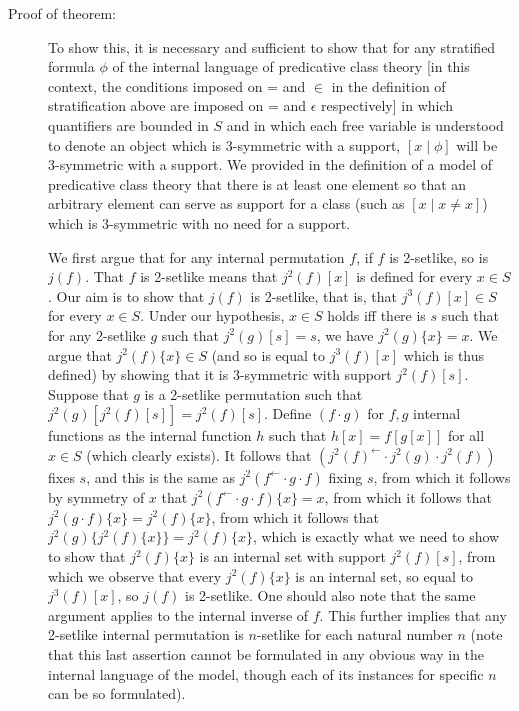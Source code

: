 \documentclass[12pt]{article}
\begin{document}
\begin{description}
\item[Proof of theorem:]   To show this, it is necessary and sufficient to show that for any stratified formula $\phi$ of the internal language of predicative class theory [in this context, the conditions imposed on = and $\in$ in the definition of stratification above are imposed on = and $\epsilon$ respectively] in which quantifiers are bounded in $S$ and  in which each free variable is understood to denote an object which is 3-symmetric
with a support, $[x \mid \phi]$ will be 3-symmetric with a support.  We provided in the definition of a model of predicative class theory  that there is at least one element so that an arbitrary element
can serve as support for a class (such as $[x\mid x \neq x]$) which is 3-symmetric with no need for a support. 

We first argue that for any internal permutation $f$,  if $f$ is 2-setlike,  so is $j(f)$.  That $f$ is 2-setlike means that $j^2(f)[x]$ is defined for every $x \in S$.   Our aim is to show that $j(f)$ is 2-setlike,
that is, that $j^3(f)[x]\in S$ for every $x \in S$.  Under our hypothesis, $x \in S$ holds iff there is $s$ such that for any 2-setlike $g$ such that $j^2(g)[s]=s$,
we have $j^2(g)\{x\}=x$.   We argue that $j^2(f)\{x\} \in S$ (and so is equal to $j^3(f)[x]$ which is thus defined)  by showing that  it is 3-symmetric with support $j^2(f)[s]$.  Suppose that $g$ is a 2-setlike permutation
such that $j^2(g)[j^2(f)[s]]=j^2(f)[s]$.   Define $(f \cdot g)$ for $f,g$ internal functions as the internal function $h$ such that $h[x] = f[g[x]]$ for all $x \in S$ (which clearly exists).
It follows that $(j^2(f)^{\leftarrow} \cdot j^2(g) \cdot j^2(f))$ fixes $s$, and this is the same as $j^2(f^{\leftarrow} \cdot g \cdot f)$ fixing $s$, from which it follows by symmetry of $x$ that
$j^2(f^{\leftarrow} \cdot g \cdot f)\{x\} = x$, from which it follows that $j^2(g \cdot f)\{x\} = j^2(f)\{x\}$, from which it follows that $j^2(g)\{j^2(f)\{x\}\} = j^2(f)\{x\}$, which is exactly what we need to show to show that $j^2(f)\{x\}$ is an internal  set with support $j^2(f)[s]$, from which we observe that every $j^2(f)\{x\}$ is an internal set, so equal to $j^3(f)[x]$, so $j(f)$ is 2-setlike.  One should also note that the same argument applies to the internal inverse of $f$.  This further implies that any 2-setlike internal permutation is $n$-setlike for each natural number $n$ (note that this last assertion cannot be formulated in any obvious way in the internal language of the model, though each of its instances for specific $n$ can be so formulated).


\end{description}
\end{document}
